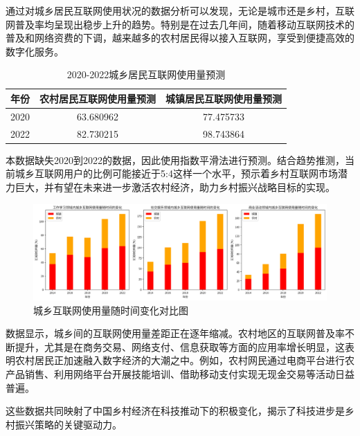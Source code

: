 通过对城乡居民互联网使用状况的数据分析可以发现，无论是城市还是乡村，互联网普及率均呈现出稳步上升的趋势。特别是在过去几年间，随着移动互联网技术的普及和网络资费的下调，越来越多的农村居民得以接入互联网，享受到便捷高效的数字化服务\cite{digital-village-strategy}。

\begin{table}[H]
    \centering
    \caption{2020-2022城乡居民互联网使用量预测}
    \begin{tabular}{ccc}
        \hline
        \hline
        \textbf{年份} &\textbf{农村居民互联网使用量预测}&\textbf{城镇居民互联网使用量预测}\\
        \hline
        2020&63.680962&77.475733\\
        2022&82.730215&98.743864\\
        \hline
    \end{tabular}
    \label{tab:Internet}
\end{table}

本数据缺失2020到2022的数据，因此使用指数平滑法进行预测。结合趋势推测，当前城乡互联网用户的比例可能接近于5:4这样一个水平，预示着乡村互联网市场潜力巨大，并有望在未来进一步激活农村经济，助力乡村振兴战略目标的实现。

\begin{figure}[H]
    \centering
    \includegraphics[width=1\linewidth]{figures/50.png}
    \caption{城乡互联网使用量随时间变化对比图}
    \label{fig:enter-label}
\end{figure}

数据显示，城乡间的互联网使用量差距正在逐年缩减。农村地区的互联网普及率不断提升，尤其是在商务交易、网络支付、信息获取等方面的应用率增长明显，这表明农村居民正加速融入数字经济的大潮之中。例如，农村网民通过电商平台进行农产品销售、利用网络平台开展技能培训、借助移动支付实现无现金交易等活动日益普遍。


这些数据共同映射了中国乡村经济在科技推动下的积极变化，揭示了科技进步是乡村振兴策略的关键驱动力。